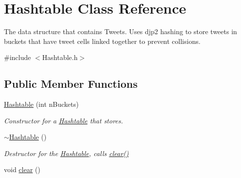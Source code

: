 \hypertarget{class_hashtable}{}\section{Hashtable Class Reference}
\label{class_hashtable}


The data structure that contains Tweets. Uses djp2 hashing to store tweets in buckets that have tweet cells linked together to prevent collisions.  




{\ttfamily \#include $<$Hashtable.\+h$>$}

\subsection*{Public Member Functions}
\begin{DoxyCompactItemize}
\item 
\hyperlink{class_hashtable_a5c46d8e76ff9ce391127ea7fb8409810}{Hashtable} (int n\+Buckets)
\begin{DoxyCompactList}\small\item\em Constructor for a \hyperlink{class_hashtable}{Hashtable} that stores. \end{DoxyCompactList}\item 
\hypertarget{class_hashtable_ac894ee97ae421a4ab263c5a0b1f4a448}{}\hyperlink{class_hashtable_ac894ee97ae421a4ab263c5a0b1f4a448}{$\sim$\+Hashtable} ()\label{class_hashtable_ac894ee97ae421a4ab263c5a0b1f4a448}

\begin{DoxyCompactList}\small\item\em Destructor for the \hyperlink{class_hashtable}{Hashtable}, calls \hyperlink{class_hashtable_a301e1bf87bbe4b7c9c561e13caa3b240}{clear()} \end{DoxyCompactList}\item 
\hypertarget{class_hashtable_a301e1bf87bbe4b7c9c561e13caa3b240}{}void \hyperlink{class_hashtable_a301e1bf87bbe4b7c9c561e13caa3b240}{clear} ()\label{class_hashtable_a301e1bf87bbe4b7c9c561e13caa3b240}


\end{DoxyCompactItemize}
